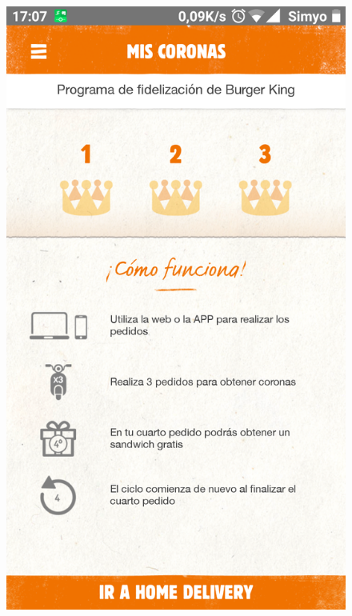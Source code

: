 \documentclass[twoside]{report}
\begin{document}
\begin{figure}[H]
\begin{center}
\includegraphics[scale=0.25]{images/restaurantes/burry0.png}

\end{center}
\end{figure}
\end{document}
